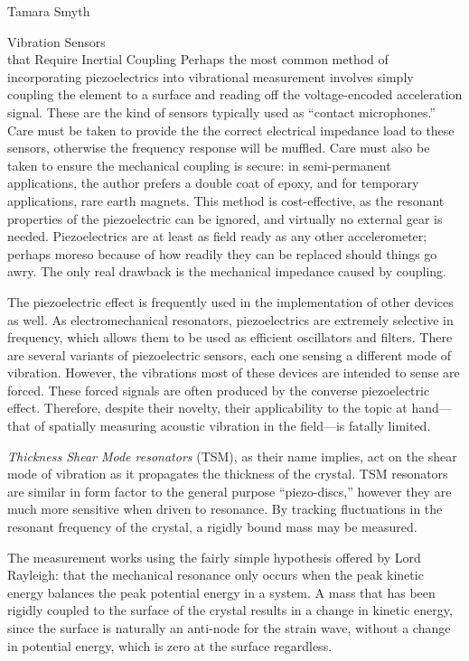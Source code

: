 \documentclass[a4paper,10pt]{report}
\numberwithin{equation}{section}
\begin{document}
\begin{chapter}{Tamara Smyth}
\begin{section}{Vibration Sensors \\that Require Inertial Coupling}
Perhaps the most common method of incorporating piezoelectrics into vibrational measurement involves simply coupling the element to a surface and reading off the voltage-encoded acceleration signal. These are the kind of sensors typically used as ``contact microphones.'' Care must be taken to provide the the correct electrical impedance load to these sensors, otherwise the frequency response will be muffled. Care must also be taken to ensure the mechanical coupling is secure: in semi-permanent applications, the author prefers a double coat of epoxy, and for temporary applications, rare earth magnets. This method is cost-effective, as the resonant properties of the piezoelectric can be ignored, and virtually no external gear is needed. Piezoelectrics are at least as field ready as any other accelerometer; perhaps moreso because of how readily they can be replaced should things go awry. The only real drawback is the mechanical impedance caused by coupling. 

The piezoelectric effect is frequently used in the implementation of other devices as well. As electromechanical resonators, piezoelectrics are extremely selective in frequency, which allows them to be used as efficient oscillators and filters. \cite[p.~27]{Kino1987} There are several variants of piezoelectric sensors, each one sensing a different mode of vibration. However, the vibrations most of these devices are intended to sense are forced. These forced signals are often produced by the converse piezoelectric effect. \cite[p.~154]{Cremer1973} Therefore, despite their novelty, their applicability to the topic at hand---that of spatially measuring acoustic vibration in the field---is fatally limited.

\emph{Thickness Shear Mode resonators} (TSM), as their name implies, act on the shear mode of vibration as it propagates the thickness of the crystal. TSM resonators are similar in form factor to the general purpose ``piezo-discs,'' however they are much more sensitive when driven to resonance. By tracking fluctuations in the resonant frequency of the crystal, a rigidly bound mass may be measured. \cite[p.~37]{Ballantine1997}

The measurement works using the fairly simple hypothesis offered by Lord Rayleigh: that the mechanical resonance only occurs when the peak kinetic energy balances the peak potential energy in a system. A mass that has been rigidly coupled to the surface of the crystal results in a change in kinetic energy, since the surface is naturally an anti-node for the strain wave, without a change in potential energy, which is zero at the surface regardless. \cite[p.~43]{Ballantine1997} 


\end{section}
\end{chapter}
\end{document}
